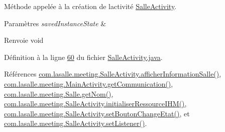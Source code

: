 Méthode appelée à la création de l\textquotesingle{}activité \hyperlink{classcom_1_1lasalle_1_1meeting_1_1_salle_activity}{Salle\+Activity}. 


\begin{DoxyParams}{Paramètres}
{\em saved\+Instance\+State} & \\
\hline
\end{DoxyParams}
\begin{DoxyReturn}{Renvoie}
void 
\end{DoxyReturn}


Définition à la ligne \hyperlink{_salle_activity_8java_source_l00060}{60} du fichier \hyperlink{_salle_activity_8java_source}{Salle\+Activity.\+java}.



Références \hyperlink{_salle_activity_8java_source_l00103}{com.\+lasalle.\+meeting.\+Salle\+Activity.\+afficher\+Information\+Salle()}, \hyperlink{_main_activity_8java_source_l00479}{com.\+lasalle.\+meeting.\+Main\+Activity.\+get\+Communication()}, \hyperlink{_salle_8java_source_l00165}{com.\+lasalle.\+meeting.\+Salle.\+get\+Nom()}, \hyperlink{_salle_activity_8java_source_l00189}{com.\+lasalle.\+meeting.\+Salle\+Activity.\+initialiser\+Ressource\+I\+H\+M()}, \hyperlink{_salle_activity_8java_source_l00085}{com.\+lasalle.\+meeting.\+Salle\+Activity.\+set\+Bouton\+Change\+Etat()}, et \hyperlink{_salle_activity_8java_source_l00132}{com.\+lasalle.\+meeting.\+Salle\+Activity.\+set\+Listener()}.


